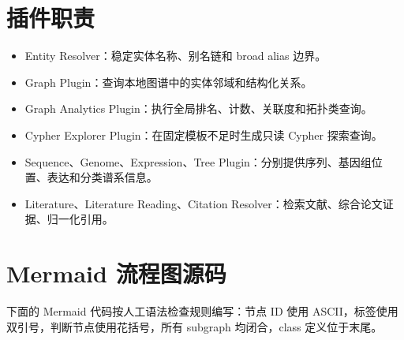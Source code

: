 \documentclass[UTF8]{ctexart}
\begin{document}
\section{插件职责}

\begin{itemize}
  \item Entity Resolver：稳定实体名称、别名链和 broad alias 边界。
  \item Graph Plugin：查询本地图谱中的实体邻域和结构化关系。
  \item Graph Analytics Plugin：执行全局排名、计数、关联度和拓扑类查询。
  \item Cypher Explorer Plugin：在固定模板不足时生成只读 Cypher 探索查询。
  \item Sequence、Genome、Expression、Tree Plugin：分别提供序列、基因组位置、表达和分类谱系信息。
  \item Literature、Literature Reading、Citation Resolver：检索文献、综合论文证据、归一化引用。
\end{itemize}

\section{Mermaid 流程图源码}

下面的 Mermaid 代码按人工语法检查规则编写：节点 ID 使用 ASCII，标签使用双引号，判断节点使用花括号，所有 subgraph 均闭合，class 定义位于末尾。
\end{document}

